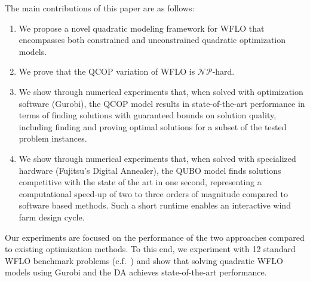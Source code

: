 \documentclass[preprint,12pt]{elsarticle}
\begin{document}
The main
contributions of this paper are as follows:
\begin{enumerate} 
\item We propose a novel quadratic modeling framework for WFLO that encompasses both constrained and unconstrained quadratic optimization models.
\item We prove that the QCOP variation of WFLO is $\mathcal{NP}$-hard.

\item We show through numerical experiments that, when solved with optimization software (Gurobi), the QCOP model results in state-of-the-art performance in terms of finding solutions with guaranteed bounds on solution quality, including finding and proving optimal solutions for a subset of the tested problem instances.

\item We show through numerical experiments that, when solved with specialized hardware (Fujitsu's Digital Annealer), the QUBO model finds solutions competitive with the state of the art in one second, representing a computational speed-up of two to three orders of magnitude compared to software based methods. Such a short runtime enables an interactive wind farm design cycle.
  

\end{enumerate}

Our experiments are focused on the performance of the two approaches
compared to 
existing optimization methods. To this end,
we experiment with 12 standard WFLO benchmark problems (c.f.~\cite{turner2014new})
and show that solving quadratic WFLO models
using Gurobi and the DA
achieves state-of-the-art performance.


\end{document}
